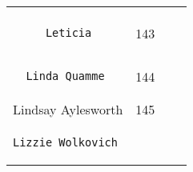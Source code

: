 \documentclass[]{article}
\begin{document}
\begin{longtable}[c]{@{}llll@{}}
\begin{minipage}[t]{0.15\columnwidth}
\end{minipage}
\\\noalign{\medskip}
\begin{minipage}[t]{0.39\columnwidth}\raggedright
\begin{verbatim}
     Leticia
\end{verbatim}
\end{minipage} & \begin{minipage}[t]{0.10\columnwidth}\raggedright
143
\end{minipage} & \begin{minipage}[t]{0.13\columnwidth}\raggedright
\end{minipage} & \begin{minipage}[t]{0.15\columnwidth}\raggedright
\end{minipage}
\\\noalign{\medskip}
\begin{minipage}[t]{0.39\columnwidth}\raggedright
\begin{verbatim}
  Linda Quamme
\end{verbatim}
\end{minipage} & \begin{minipage}[t]{0.10\columnwidth}\raggedright
144
\end{minipage} & \begin{minipage}[t]{0.13\columnwidth}\raggedright
\end{minipage} & \begin{minipage}[t]{0.15\columnwidth}\raggedright
\end{minipage}
\\\noalign{\medskip}
\begin{minipage}[t]{0.39\columnwidth}\raggedright
Lindsay Aylesworth
\end{minipage} & \begin{minipage}[t]{0.10\columnwidth}\raggedright
145
\end{minipage} & \begin{minipage}[t]{0.13\columnwidth}\raggedright
\end{minipage} & \begin{minipage}[t]{0.15\columnwidth}\raggedright
\end{minipage}
\\\noalign{\medskip}
\begin{minipage}[t]{0.39\columnwidth}\raggedright
\begin{verbatim}
Lizzie Wolkovich
\end{verbatim}
\end{minipage} & \begin{minipage}[t]{0.10\columnwidth}\raggedright

\end{minipage}
\end{longtable}
\end{document}
